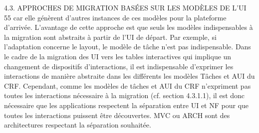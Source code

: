 \documentclass{article}
\begin{document}
4.3. APPROCHES DE MIGRATION BASÉES SUR LES MODÈLES DE L’UI
55
car elle g\'{e}n\`{e}rent d’autres instances de ces mod\`{e}les pour la plateforme d’arriv\'{e}e.
L’avantage de cette approche est que seuls les mod\`{e}les indispensables \`{a} la migration sont abstraits
\`{a} partir de l’UI de d\'{e}part. Par exemple, si l’adaptation concerne le layout, le mod\`{e}le de t\^{a}che n’est pas
indispensable. Dans le cadre de la migration des UI vers les tables interactives qui implique un changement de dispositifs d’interactions, il est indispensable d’exprimer les interactions de mani\`{e}re abstraite
dans les diff\'{e}rents les mod\`{e}les T\^{a}ches et AUI du CRF. Cependant, comme les mod\`{e}les de t\^{a}ches et
AUI du CRF n’expriment pas toutes les interactions n\'{e}cessaire \`{a} la migration (cf. section 4.3.1.1), il
est donc n\'{e}cessaire que les applications respectent la s\'{e}paration entre UI et NF pour que toutes les
interactions puissent \^{e}tre d\'{e}couvertes. MVC ou ARCH sont des architectures respectant la s\'{e}paration
souhait\'{e}e.
 
\end{document}
